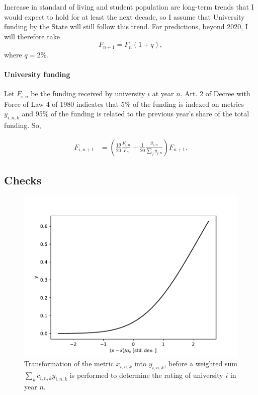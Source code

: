 \documentclass[twocolumn]{article}
\begin{document}
Increase in standard of living and student population are long-term trends that I would expect to hold for at least the next decade, so I assume that University funding by the State will still follow this trend. For predictions, beyond 2020, I will therefore take
\begin{equation}
    F_{n+1} = F_n (1 + q), \label{eq:F}
\end{equation}
where $q = 2$\%.

\paragraph{University funding}
Let $F_{i,n}$ be the funding received by university $i$ at year $n$. Art. 2 of
Decree with Force of Law 4 of 1980 indicates that 5\% of the funding is indexed
on metrics $y_{i,n,k}$ and 95\% of the funding is related to the previous year's
share of the total funding.  So,

\begin{align}
    F_{i,n+1} &= \left( \frac{19}{20} \frac{F_{i,n}}{F_{n}} 
                      + \frac 1{20} \frac{y_{i,n}}{\sum_j y_{j,n}} 
                \right) F_{n+1}.
        \label{eq:afd}
\end{align}


\subsection{Checks}
\begin{figure}
\centering
\includegraphics[width=.85\linewidth]{pdf/transform.pdf}
\caption{Transformation of the metric $x_{i,n,k}$ into $y_{i,n,k}$, before a weighted sum 
$\sum_k c_{i,n,k} y_{i,n,k}$ is performed to determine the rating of university $i$ in year $n$.}
\label{fig:transform}
\end{figure}
\end{document}
